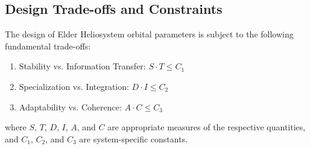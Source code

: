 \subsection{Design Trade-offs and Constraints}

\begin{theorem}
The design of Elder Heliosystem orbital parameters is subject to the following fundamental trade-offs:
\begin{enumerate}
    \item Stability vs. Information Transfer: $S \cdot T \leq C_1$
    \item Specialization vs. Integration: $D \cdot I \leq C_2$
    \item Adaptability vs. Coherence: $A \cdot C \leq C_3$
\end{enumerate}
where $S$, $T$, $D$, $I$, $A$, and $C$ are appropriate measures of the respective quantities, and $C_1$, $C_2$, and $C_3$ are system-specific constants.
\end{theorem}

